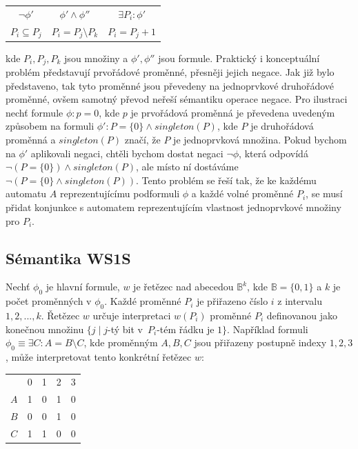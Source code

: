 \begin{center}
    \begin{tabular}{ c c c } 
        $\neg \phi' $ & $ \phi' \wedge \phi'' $ & $ \exists P_i : \phi' $  \\
        $P_i \subseteq P_j $ & $ P_i = P_j \setminus P_k $ & $ P_i = P_j + 1 $  \\ 
    \end{tabular}
\end{center}

kde $P_i,P_j,P_k$ jsou množiny a $\phi',\phi''$ jsou formule. Praktický i konceptuální problém představují prvořádové proměnné, přesněji jejich negace. Jak již bylo představeno, tak tyto proměnné jsou převedeny na jednoprvkové druhořádové proměnné, ovšem samotný převod neřeší sémantiku operace negace. Pro ilustraci nechť formule $\phi: p=0$, kde $p$ je prvořádová proměnná je převedena uvedeným způsobem na formuli $\phi': P=\{ 0 \} \wedge singleton(P)$, kde $P$ je druhořádová proměnná a $singleton(P)$ značí, že $P$ je jednoprvková množina. Pokud bychom na $\phi'$ aplikovali negaci, chtěli bychom dostat negaci $\neg \phi$, která odpovídá $\neg(P=\{ 0 \}) \wedge singleton(P)$, ale místo ní dostáváme $\neg(P=\{ 0 \} \wedge singleton(P))$. Tento problém se řeší tak, že ke každému automatu $A$ reprezentujícímu podformuli $\phi$ a každé volné proměnné $P_i$, se musí přidat konjunkce s automatem reprezentujícím vlastnost jednoprvkové množiny pro $P_i$.

\subsection{Sémantika WS1S} 

Nechť $\phi_0$ je hlavní formule, $w$ je řetězec nad abecedou $\mathbb{B}^k$, kde $\mathbb{B}=\{ 0,1 \}$ a $k$ je počet proměnných v $\phi_0$. Každé proměnné $P_i$ je přiřazeno číslo $i$ z intervalu $1,2,...,k$. Řetězec $w$ určuje interpretaci $w(P_i)$ proměnné $P_i$ definovanou jako konečnou množinu $\{ j \mid j$-tý bit v~$P_i$-tém řádku je $1 \} $. Například formuli $\phi_0 \equiv \exists C: A = B \setminus C $, kde proměnným $A,B,C$ jsou přiřazeny postupně indexy $1,2,3$, může interpretovat tento konkrétní řetězec $w$:

\begin{center}
    \begin{tabular}{ c c c c c } 
         & 0 & 1 & 2 & 3  \\
        $A$ & 1 & 0 & 1 & 0  \\
        $B$ & 0 & 0 & 1 & 0  \\
        $C$ & 1 & 1 & 0 & 0  \\
    \end{tabular}
\end{center}

